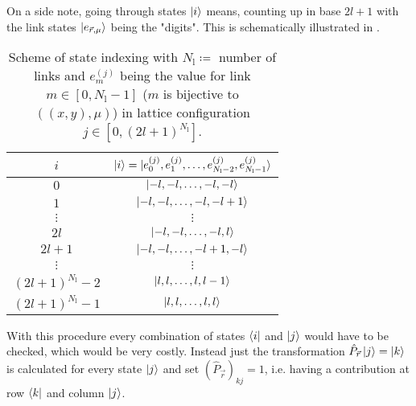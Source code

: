 On a side note, going through states $\ket{i}$ means, counting up in base $2l+1$ with the link states $\ket{e_{\vec{r}, \mu}}$ being the "digits". This is schematically illustrated in .

\begin{table}[h]
	\begin{tabular}{c|c}
		$i$                       & $\ket{i}=\ket{e_{0}^{(j)}, e_{1}^{(j)}, \dots, e_{N_{\text{l}}-2}^{(j)}, e_{N_{\text{l}}-1}^{(j)}}$ \\
		\hline
		$0$                       & $\ket{-l,-l,\dots, -l,-l}$                                                                          \\
		$1$                       & $\ket{-l,-l,\dots,-l,-l+1}$                                                                         \\
		$\vdots$                  & $\vdots$                                                                                            \\
		$2l$                      & $\ket{-l,-l,\dots,-l,l}$                                                                            \\
		$2l+1$                    & $\ket{-l,-l,\dots,-l+1,-l}$                                                                         \\
		$\vdots$                  & $\vdots$                                                                                            \\
		$(2l+1)^{N_{\text{l}}}-2$ & $\ket{l,l,\dots,l,l-1}$                                                                             \\
		$(2l+1)^{N_{\text{l}}}-1$ & $\ket{l,l,\dots,l,l}$
	\end{tabular}
	\caption{Scheme of state indexing with $N_{\text{l}}\coloneq$ number of links and $e_{m}^{(j)}$ being the value for link $m\in[0, N_{\text{l}}-1]$ ($m$ is bijective to $((x, y), \mu)$) in lattice configuration $j\in[0,(2l+1)^{N_{\text{l}}}]$.}\label{tab:steidx}
\end{table}

With this procedure every combination of states $\bra{i}$ and $\ket{j}$ would have to be checked, which would be very costly. Instead just the transformation $\hat{P}_{\vec{r}}\ket{j}=\ket{k}$ is calculated for every state $\ket{j}$ and set $(\hat{P}_{\vec{r}})_{kj}=1$, i.e. having a contribution at row $\bra{k}$ and column $\ket{j}$.

